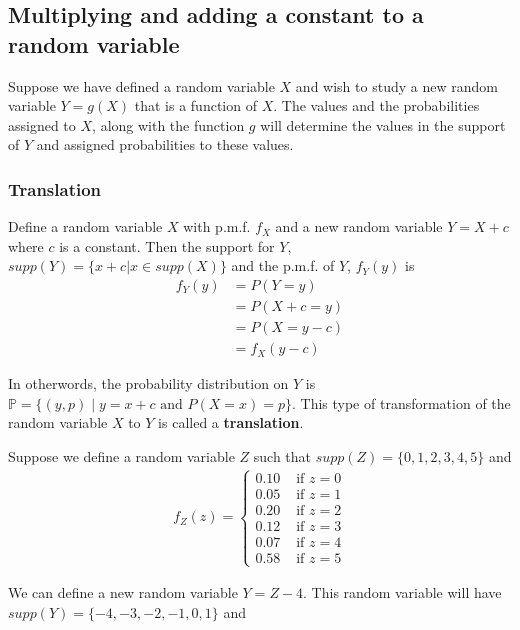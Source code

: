 \subsection{Multiplying and adding a constant to a random variable}

Suppose we have defined a random variable $X$ and wish to study a new random variable $Y = g(X)$ that is a function of $X$.
The values and the probabilities assigned to $X$, along with the function $g$ will determine the values in the support of $Y$ and assigned probabilities to these values.

\subsubsection{Translation}

Define a random variable $X$ with p.m.f. $f_{X}$ and a new random variable $Y = X+c$ where $c$ is a constant. Then the support for $Y$, $supp(Y) = \{ x+c | x \in supp(X) \}$ and the p.m.f. of $Y$, $f_{Y}(y)$ is 
\begin{align}
    f_{Y}(y) &= P(Y=y) \\ 
     &= P(X+c = y)\\ 
     &= P(X=y-c)\\
     &= f_{X}(y-c)
\end{align}

In otherwords, the  probability distribution on $Y$ is $\mathbb{P} = \{ (y,p) \;|\; y=x+c \text{ and } P(X=x) = p \}$.
This type of transformation of the random variable $X$ to $Y$ is called a \textbf{translation}.


\ex Suppose we define a random variable $Z$ such that $supp(Z) = \{0,1,2,3,4,5\}$ and 
\begin{align}
    f_{Z}(z) = \begin{cases}
                0.10 & \text{ if } z=0\\
                0.05 & \text{ if } z=1\\
                0.20 & \text{ if } z=2\\
                0.12 & \text{ if } z=3\\
                0.07 & \text{ if } z=4\\
                0.58 & \text{ if } z=5
               \end{cases}
\end{align}

We can define a new random variable $Y = Z-4$.
This random variable will have $supp(Y) =\{-4,-3,-2,-1,0,1\}$ and 

